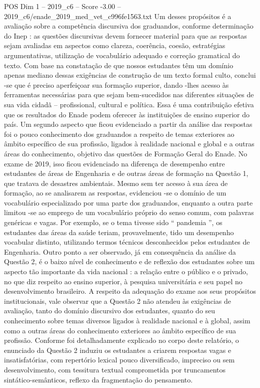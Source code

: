\begin{textsample}{POS Dim 1 – 2019\_c6 – Score -3.00 – 2019\_c6/enade\_2019\_med\_vet\_c996fe1563.txt}
Um desses propósitos é a avaliação sobre a competência discursiva dos graduandos, conforme determinação do Inep : as questões discursivas devem fornecer material para que as respostas sejam avaliadas em aspectos como clareza, coerência, coesão, estratégias argumentativas, utilização de vocabulário adequado e correção gramatical do texto.
Com base na constatação de que nossos estudantes têm um domínio apenas mediano dessas exigências de construção de um texto formal culto, conclui -se que é preciso aperfeiçoar sua formação superior, dando -lhes acesso às ferramentas necessárias para que sejam bem-sucedidos nas diferentes situações de sua vida cidadã – profissional, cultural e política.
Essa é uma contribuição efetiva que os resultados do Enade podem oferecer às instituições de ensino superior do país.
Um segundo aspecto que ficou evidenciado a partir da análise das respostas foi o pouco conhecimento dos graduandos a respeito de temas exteriores ao âmbito específico de sua profissão, ligados à realidade nacional e global e a outras áreas do conhecimento, objetivo das questões de Formação Geral do Enade.
No exame de 2019, isso ficou evidenciado na diferença de desempenho entre estudantes de áreas de Engenharia e de outras áreas de formação na Questão 1, que tratava de desastres ambientais.
Mesmo sem ter acesso à sua área de formação, ao se analisarem as respostas, evidenciou -se o domínio de um vocabulário especializado por uma parte dos graduandos, enquanto a outra parte limitou -se ao emprego de um vocabulário próprio do senso comum, com palavras genéricas e vagas.
Por exemplo, se o tema tivesse sido “ pandemia ”, os estudantes das áreas da saúde teriam, provavelmente, tido um desempenho vocabular distinto, utilizando termos técnicos desconhecidos pelos estudantes de Engenharia.
Outro ponto a ser observado, já em consequência da análise da Questão 2, é o baixo nível de conhecimento e de reflexão dos estudantes sobre um aspecto tão importante da vida nacional : a relação entre o público e o privado, no que diz respeito ao ensino superior, à pesquisa universitária e seu papel no desenvolvimento brasileiro.
A respeito da adequação do exame aos seus propósitos institucionais, vale observar que a Questão 2 não atendeu às exigências de avaliação, tanto do domínio discursivo dos estudantes, quanto do seu conhecimento sobre temas diversos ligados à realidade nacional e à global, assim como a outras áreas do conhecimento exteriores ao âmbito específico de sua profissão.
Conforme foi detalhadamente explicado no corpo deste relatório, o enunciado da Questão 2 induziu os estudantes a criarem respostas vagas e insatisfatórias, com repertório lexical pouco diversificado, impreciso ou sem desenvolvimento, com tessitura textual comprometida por truncamentos sintático-semânticos, reflexo da fragmentação do pensamento.

\end{textsample}
